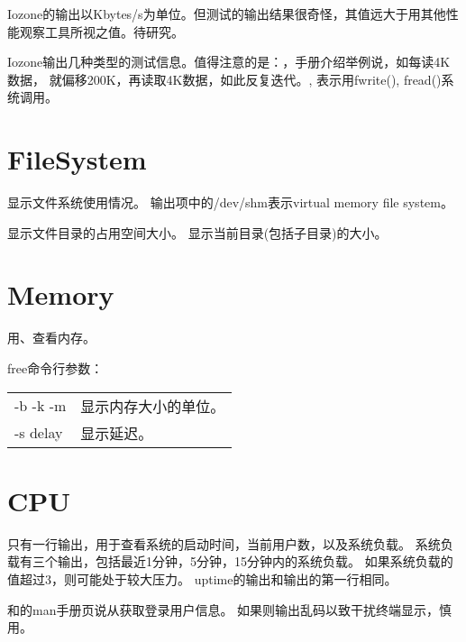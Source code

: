 Iozone的输出以Kbytes/s为单位。但测试的输出结果很奇怪，其值远大于用其他性能观察工具所视之值。待研究。

Iozone输出几种类型的测试信息。值得注意的是：，手册介绍举例说，如每读4K数据，
就偏移200K，再读取4K数据，如此反复迭代。, 表示用fwrite(), fread()系统调用。

\section{FileSystem}
显示文件系统使用情况。
输出项中的/dev/shm表示virtual memory file system。

显示文件目录的占用空间大小。 
显示当前目录(包括子目录)的大小。

\section{Memory}
用、查看内存。

free命令行参数：\\
\begin{tabular}{ll}
-b -k -m    & 显示内存大小的单位。\\
-s delay    & 显示延迟。\\
\end{tabular}

\section{CPU}
只有一行输出，用于查看系统的启动时间，当前用户数，以及系统负载。
系统负载有三个输出，包括最近1分钟，5分钟，15分钟内的系统负载。
如果系统负载的值超过3，则可能处于较大压力。
uptime的输出和输出的第一行相同。

和的man手册页说从获取登录用户信息。
如果则输出乱码以致干扰终端显示，慎用。


